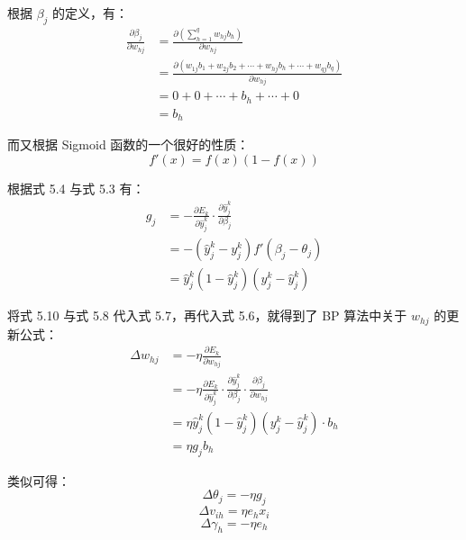 \documentclass[../studies-ml.tex]{subfiles}
\begin{document}
根据 $\beta_j$ 的定义，有：
\begin{equation}
  \begin{split}
    \frac{\partial \beta_j}{\partial w_{hj}} & = \frac{\partial (\sum_{h=1}^{q} w_{hj} b_h) }{\partial w_{hj}} \\
    & = \frac{\partial (w_{1j}b_1 + w_{2j}b_2 + \cdots + w_{hj}b_h + \cdots + w_{qj}b_q)}{\partial w_{hj}} \\
    & = 0 + 0 + \cdots + b_h + \cdots + 0 \\
    & = b_h
  \end{split}
\end{equation}

而又根据 Sigmoid 函数的一个很好的性质：
\begin{equation}
  f'(x) = f(x)(1 - f(x))
\end{equation}

根据式 5.4 与式 5.3 有：
\begin{equation}
  \begin{split}
    g_j & = -\frac{\partial E_k}{\partial \hat{y}_j^k} \cdot \frac{\partial \hat{y}_j^k}{\partial \beta_j} \\
    & = -(\hat{y}_j^k - y_j^k)f'(\beta_j - \theta_j) \\
    & = \hat{y}_j^k (1 - \hat{y}_j^k)(y_j^k - \hat{y}_j^k)
  \end{split}
\end{equation}

将式 5.10 与式 5.8 代入式 5.7，再代入式 5.6，就得到了 BP 算法中关于 $w_{hj}$ 的更新公式：
\begin{equation}
  \begin{split}
    \Delta w_{hj} & = -\eta \frac{\partial E_k}{\partial w_{hj}} \\
    & = -\eta \frac{\partial E_k}{\partial \hat{y}_j^k} \cdot
    \frac{\partial \hat{y}_j^k}{\partial \beta_j} \cdot
    \frac{\partial \beta_j}{\partial w_{hj}} \\
    & = \eta \hat{y}_j^k (1 - \hat{y}_j^k)(y_j^k - \hat{y}_j^k) \cdot b_h \\
    & = \eta g_j b_h
  \end{split}
\end{equation}

类似可得：
\begin{equation}
  \Delta \theta_j = -\eta g_j
\end{equation}
\begin{equation}
  \Delta v_{ih} = \eta e_h x_i
\end{equation}
\begin{equation}
  \Delta \gamma_h = -\eta e_h
\end{equation}
\end{document}

